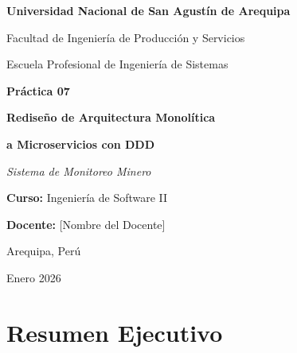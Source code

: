\documentclass[12pt,a4paper]{article}
\begin{document}
\begin{titlepage}
    \centering
    \vspace*{1cm}

    {\LARGE\bfseries Universidad Nacional de San Agustín de Arequipa\par}
    \vspace{0.5cm}
    {\Large Facultad de Ingeniería de Producción y Servicios\par}
    \vspace{0.3cm}
    {\Large Escuela Profesional de Ingeniería de Sistemas\par}

    \vspace{2cm}

    {\huge\bfseries Práctica 07\par}
    \vspace{0.5cm}
    {\LARGE\bfseries Rediseño de Arquitectura Monolítica\par}
    {\LARGE\bfseries a Microservicios con DDD\par}

    \vspace{1.5cm}

    {\Large\itshape Sistema de Monitoreo Minero\par}

    \vspace{2cm}

    {\Large\textbf{Curso:} Ingeniería de Software II\par}
    \vspace{0.3cm}
    {\Large\textbf{Docente:} [Nombre del Docente]\par}

    \vfill

    {\large Arequipa, Perú\par}
    {\large Enero 2026\par}
\end{titlepage}

\tableofcontents
\newpage

\section{Resumen Ejecutivo}
\end{document}
